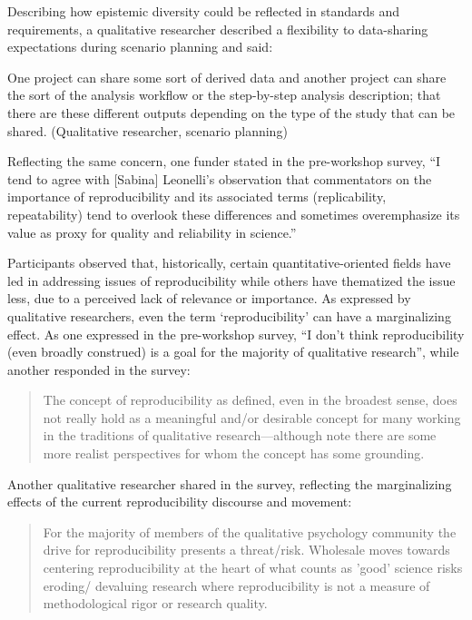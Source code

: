 \documentclass[authordate, meta]{jote-new-article}
\begin{document}
	Describing how epistemic diversity could be reflected in standards and requirements, a qualitative researcher described a flexibility to data-sharing expectations during scenario planning and said:



	One project can share some sort of derived data and another project can share the sort of the analysis workflow or the step-by-step analysis description; that there are these different outputs depending on the type of the study that can be shared. (Qualitative researcher, scenario planning)



	Reflecting the same concern, one funder stated in the pre-workshop survey, “I tend to agree with [Sabina] Leonelli's observation that commentators on the importance of reproducibility and its associated terms (replicability, repeatability) tend to overlook these differences and sometimes overemphasize its value as proxy for quality and reliability in science.”



	Participants observed that, historically, certain quantitative-oriented fields have led in addressing issues of reproducibility while others have thematized the issue less, due to a perceived lack of relevance or importance. As expressed by qualitative researchers, even the term ‘reproducibility' can have a marginalizing effect. As one expressed in the pre-workshop survey, “I don't think reproducibility (even broadly construed) is a goal for the majority of qualitative research”, while another responded in the survey:



	\begin{quote}The concept of reproducibility as defined, even in the broadest sense, does not really hold as a meaningful and/or desirable concept for many working in the traditions of qualitative research—although note there are some more realist perspectives for whom the concept has some grounding.\end{quote}



	Another qualitative researcher shared in the survey, reflecting the marginalizing effects of the current reproducibility discourse and movement:



	\begin{quote}For the majority of members of the qualitative psychology community the drive for reproducibility presents a threat/risk. Wholesale moves towards centering reproducibility at the heart of what counts as 'good' science risks eroding/ devaluing research where reproducibility is not a measure of methodological rigor or research quality.\end{quote}
\end{document}

